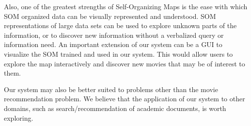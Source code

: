 \documentclass[conference]{IEEEtran}
\begin{document}
Also, one of the greatest strengths of Self-Organizing Maps is the ease with which SOM organized data can be visually represented and understood. SOM representations of large data sets can be used to explore unknown parts of the information, or to discover new information without a verbalized query or information need. An important extension of our system can be a GUI to visualize the SOM trained and used in our system. This would allow users to explore the map interactively and discover new movies that may be of interest to them.

Our system may also be better suited to problems other than the movie recommendation problem. We believe that the application of our system to other domains, such as search/recommendation of academic documents, is worth exploring.  





%
%



%
%
\end{document}
